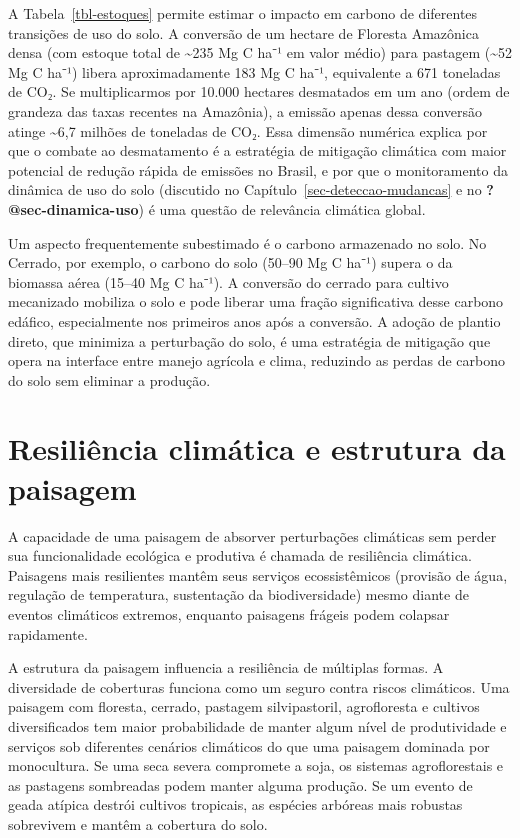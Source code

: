 \documentclass[
  portuguese,
  11pt,
  a4paper,
  open=any]{scrbook}
\begin{document}
A Tabela~\ref{tbl-estoques} permite estimar o impacto em carbono de
diferentes transições de uso do solo. A conversão de um hectare de
Floresta Amazônica densa (com estoque total de \textasciitilde235 Mg C
ha⁻¹ em valor médio) para pastagem (\textasciitilde52 Mg C ha⁻¹) libera
aproximadamente 183 Mg C ha⁻¹, equivalente a 671 toneladas de CO₂. Se
multiplicarmos por 10.000 hectares desmatados em um ano (ordem de
grandeza das taxas recentes na Amazônia), a emissão apenas dessa
conversão atinge \textasciitilde6,7 milhões de toneladas de CO₂. Essa
dimensão numérica explica por que o combate ao desmatamento é a
estratégia de mitigação climática com maior potencial de redução rápida
de emissões no Brasil, e por que o monitoramento da dinâmica de uso do
solo (discutido no Capítulo~\ref{sec-deteccao-mudancas} e no
\textbf{?@sec-dinamica-uso}) é uma questão de relevância climática
global.

Um aspecto frequentemente subestimado é o carbono armazenado no solo. No
Cerrado, por exemplo, o carbono do solo (50--90 Mg C ha⁻¹) supera o da
biomassa aérea (15--40 Mg C ha⁻¹). A conversão do cerrado para cultivo
mecanizado mobiliza o solo e pode liberar uma fração significativa desse
carbono edáfico, especialmente nos primeiros anos após a conversão. A
adoção de plantio direto, que minimiza a perturbação do solo, é uma
estratégia de mitigação que opera na interface entre manejo agrícola e
clima, reduzindo as perdas de carbono do solo sem eliminar a produção.

\section{Resiliência climática e estrutura da
paisagem}\label{resiliuxeancia-climuxe1tica-e-estrutura-da-paisagem}

A capacidade de uma paisagem de absorver perturbações climáticas sem
perder sua funcionalidade ecológica e produtiva é chamada de resiliência
climática. Paisagens mais resilientes mantêm seus serviços
ecossistêmicos (provisão de água, regulação de temperatura, sustentação
da biodiversidade) mesmo diante de eventos climáticos extremos, enquanto
paisagens frágeis podem colapsar rapidamente.

A estrutura da paisagem influencia a resiliência de múltiplas formas. A
diversidade de coberturas funciona como um seguro contra riscos
climáticos. Uma paisagem com floresta, cerrado, pastagem silvipastoril,
agrofloresta e cultivos diversificados tem maior probabilidade de manter
algum nível de produtividade e serviços sob diferentes cenários
climáticos do que uma paisagem dominada por monocultura. Se uma seca
severa compromete a soja, os sistemas agroflorestais e as pastagens
sombreadas podem manter alguma produção. Se um evento de geada atípica
destrói cultivos tropicais, as espécies arbóreas mais robustas
sobrevivem e mantêm a cobertura do solo.
\end{document}
